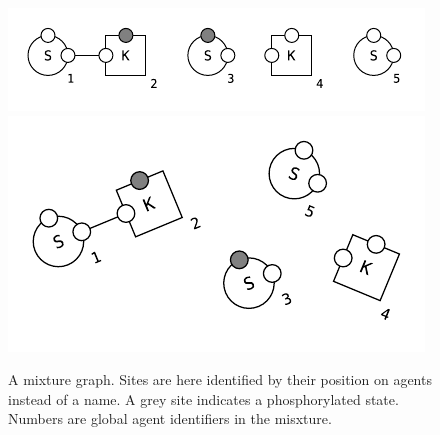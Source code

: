 \begin{figure}[!h]
  \vskip -0.25cm
  \begin{center}
    \ifshort
    \includegraphics[scale=1.0]{figures/mixture-linear.pdf}
    \else
    \includegraphics[scale=0.9]{figures/mixture.pdf}
    \fi
  \end{center}
  \vskip -0.5cm
\caption{A mixture graph. Sites are here identified by their position on
agents instead of a name. 
A grey site indicates a phosphorylated state. Numbers
are global agent identifiers in the misxture.}
  \label{fig:mixture}
\end{figure}